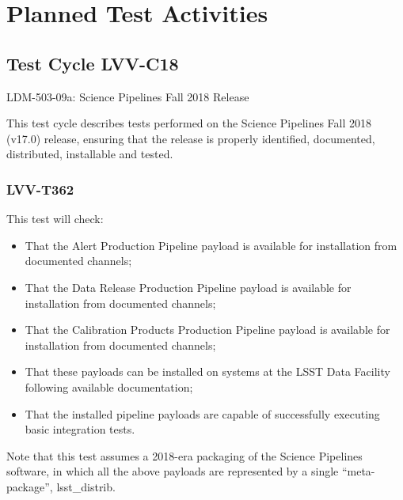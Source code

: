 \documentclass[DM,lsstdraft,STR,toc]{lsstdoc}
\begin{document}
\newpage
\section{Planned Test Activities}
\label{sect:plannedtestactivities}


\subsection{Test Cycle LVV-C18}

LDM-503-09a: Science Pipelines Fall 2018 Release


This test cycle describes tests performed on the Science Pipelines Fall
2018 (v17.0) release, ensuring that the release is properly identified,
documented, distributed, installable and tested.



\subsubsection{LVV-T362}

This test will check:
\begin{itemize}
\item That the Alert Production Pipeline payload is available for installation from documented channels;
\item That the Data Release Production Pipeline payload is available for installation from documented channels;
\item That the Calibration Products Production Pipeline payload is available for installation from documented channels;
\item That these payloads can be installed on systems at the LSST Data Facility following available documentation;
\item That the installed pipeline payloads are capable of successfully executing basic integration tests.
\end{itemize}
Note that this test assumes a 2018-era packaging of the Science Pipelines software, in which all the above payloads are represented by a single “meta-package”, lsst\_distrib.
\end{document}
